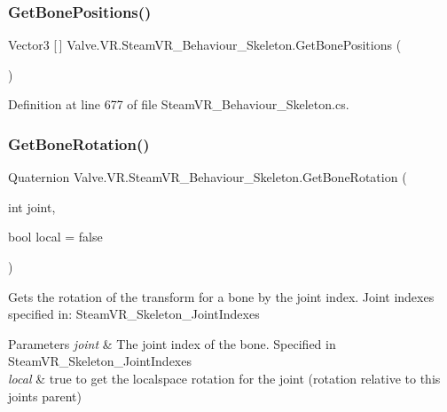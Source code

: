 \subsubsection{\texorpdfstring{GetBonePositions()}{GetBonePositions()}}
{\footnotesize\ttfamily Vector3 \mbox{[}$\,$\mbox{]} Valve.\+V\+R.\+Steam\+V\+R\+\_\+\+Behaviour\+\_\+\+Skeleton.\+Get\+Bone\+Positions (\begin{DoxyParamCaption}{ }\end{DoxyParamCaption})\hspace{0.3cm}{\ttfamily [protected]}}



Definition at line 677 of file Steam\+V\+R\+\_\+\+Behaviour\+\_\+\+Skeleton.\+cs.

\mbox{\label{class_valve_1_1_v_r_1_1_steam_v_r___behaviour___skeleton_abb297ddb9a83001f0c95907e9dc17543}} 
\subsubsection{\texorpdfstring{GetBoneRotation()}{GetBoneRotation()}}
{\footnotesize\ttfamily Quaternion Valve.\+V\+R.\+Steam\+V\+R\+\_\+\+Behaviour\+\_\+\+Skeleton.\+Get\+Bone\+Rotation (\begin{DoxyParamCaption}\item[{int}]{joint,  }\item[{bool}]{local = {\ttfamily false} }\end{DoxyParamCaption})}



Gets the rotation of the transform for a bone by the joint index. Joint indexes specified in\+: Steam\+V\+R\+\_\+\+Skeleton\+\_\+\+Joint\+Indexes 


\begin{DoxyParams}{Parameters}
{\em joint} & The joint index of the bone. Specified in Steam\+V\+R\+\_\+\+Skeleton\+\_\+\+Joint\+Indexes\\
\hline
{\em local} & true to get the localspace rotation for the joint (rotation relative to this joint\textquotesingle{}s parent)\\
\hline
\end{DoxyParams}


